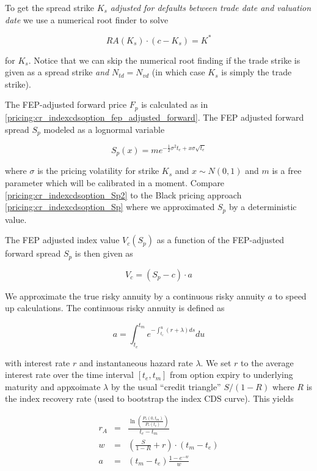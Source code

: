 To get the spread strike $K_s$ {\em adjusted for defaults between trade date and valuation date} we use a numerical root
finder to solve

\begin{equation}
RA(K_s) \cdot (c - K_s) = K^*
\end{equation}

for $K_s$. Notice that we can skip the numerical root finding if the trade strike is given as a spread strike {\em and}
$N_{td} = N_{vd}$ (in which case $K_s$ is simply the trade strike).

The FEP-adjusted forward price $F_p$ is calculated as in \ref{pricing:cr_indexcdsoption_fep_adjusted_forward}.  The FEP
adjusted forward spread $S_p$ modeled as a lognormal variable

\begin{equation}\label{pricing:cr_indexcdsoption_Sp2}
S_p(x) = m e^{-\frac{1}{2} \sigma^2 t_e + x \sigma \sqrt{t_e}}
\end{equation}

where $\sigma$ is the pricing volatility for strike $K_s$ and $x \sim N(0,1)$ and $m$ is a free parameter which will be
calibrated in a moment. Compare \ref{pricing:cr_indexcdsoption_Sp2} to the Black pricing
approach \ref{pricing:cr_indexcdsoption_Sp} where we approximated $S_p$ by a deterministic value.

The FEP adjusted index value $V_c(S_p)$ as a function of the FEP-adjusted forward spread $S_p$ is then given as

\begin{equation}
V_c = (S_p - c)\cdot a
\end{equation}

We approximate the true risky annuity by a continuous risky annuity $a$ to speed up calculations. The continuous risky
annuity is defined as

\begin{equation}
a = \int_{t_e}^{t_m} e^{-\int_{t_e}^u (r + \lambda) ds} du
\end{equation}

with interest rate $r$ and instantaneous hazard rate $\lambda$. We set $r$ to the average interest rate over the time
interval $[t_e, t_m]$ from option expiry to underlying maturity and appxoimate $\lambda$ by the usual ``credit
triangle'' $S/(1-R)$ where $R$ is the index recovery rate (used to bootstrap the index CDS curve). This yields

\begin{eqnarray}
r_A &=& \frac{\ln \left( \frac{P_{*}(0,t_m)}{P_{*}(t_e)} \right)}{t_e-t_m} \\
w &=& \left(\frac{S}{1-R} + r \right) \cdot (t_m-t_e) \\
a &=& \left(t_m-t_e\right) \frac{1 - e^{-w}}{w}
\end{eqnarray}

